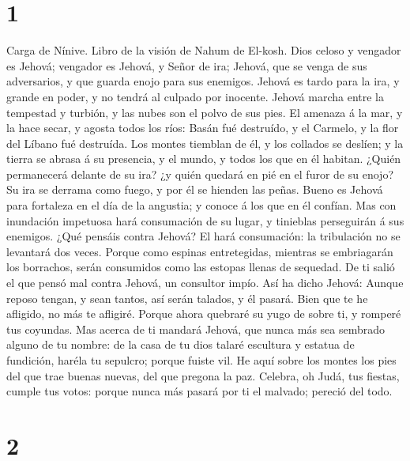 \hypertarget{section}{%
\section{1}\label{section}}

 Carga de Nínive. Libro de la visión de Nahum de El-kosh.
 Dios celoso y vengador es Jehová; vengador es Jehová, y
Señor de ira; Jehová, que se venga de sus adversarios, y que guarda
enojo para sus enemigos.  Jehová es tardo para la ira, y
grande en poder, y no tendrá al culpado por inocente. Jehová marcha
entre la tempestad y turbión, y las nubes son el polvo de sus pies.
 El amenaza á la mar, y la hace secar, y agosta todos los
ríos: Basán fué destruído, y el Carmelo, y la flor del Líbano fué
destruída.  Los montes tiemblan de él, y los collados se
deslíen; y la tierra se abrasa á su presencia, y el mundo, y todos los
que en él habitan.  ¿Quién permanecerá delante de su ira?
¿y quién quedará en pié en el furor de su enojo? Su ira se derrama como
fuego, y por él se hienden las peñas.  Bueno es Jehová
para fortaleza en el día de la angustia; y conoce á los que en él
confían.  Mas con inundación impetuosa hará consumación de
su lugar, y tinieblas perseguirán á sus enemigos.  ¿Qué
pensáis contra Jehová? El hará consumación: la tribulación no se
levantará dos veces.  Porque como espinas entretegidas,
mientras se embriagarán los borrachos, serán consumidos como las estopas
llenas de sequedad.  De ti salió el que pensó mal contra
Jehová, un consultor impío.  Así ha dicho Jehová: Aunque
reposo tengan, y sean tantos, así serán talados, y él pasará. Bien que
te he afligido, no más te afligiré.  Porque ahora
quebraré su yugo de sobre ti, y romperé tus coyundas. 
Mas acerca de ti mandará Jehová, que nunca más sea sembrado alguno de tu
nombre: de la casa de tu dios talaré escultura y estatua de fundición,
haréla tu sepulcro; porque fuiste vil.  He aquí sobre los
montes los pies del que trae buenas nuevas, del que pregona la paz.
Celebra, oh Judá, tus fiestas, cumple tus votos: porque nunca más pasará
por ti el malvado; pereció del todo.

\hypertarget{section-1}{%
\section{2}\label{section-1}}

